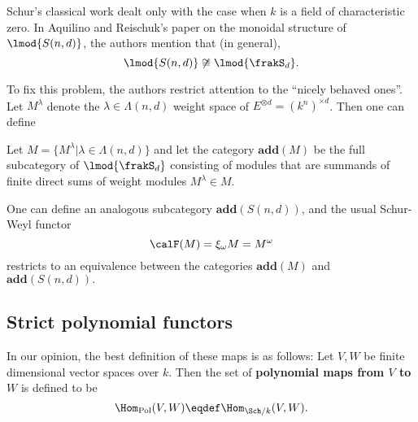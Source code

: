 \documentclass[12pt]{article}
\begin{document}
	Schur's classical work dealt only with the case when $k$ is a field of characteristic zero. In Aquilino and Reischuk's paper \cite{aquilino-reischuk} 
	on the monoidal structure of $\lmod{S(n,d)}$, the authors mention that (in general),
	\[\lmod{S(n,d)}\not\cong\lmod{\frakS_d}.\]

	To fix this problem, the authors restrict attention to the ``nicely behaved ones''. Let $M^\lambda$ denote 
	the $\lambda\in\Lambda(n,d)$ weight space of $E^{\otimes d}=(k^n)^{\times d}$. Then one can define 
	\begin{defn}
		Let $M=\{M^\lambda|\lambda\in\Lambda(n,d)\}$ and let the category $\mathbf{add}(M)$ be the full subcategory of $\lmod{\frakS_d}$ consisting 
		of modules that are summands of finite direct sums of weight modules $M^\lambda\in M$.
	\end{defn}
	One can define an analogous subcategory $\mathbf{add}(S(n,d))$, and the usual Schur-Weyl functor 
	\[\calF(M)=\xi_\omega M=M^\omega\]
	restricts to an equivalence between the categories $\mathbf{add}(M)$ and $\mathbf{add}(S(n,d)).$

	\subsection{Strict polynomial functors}
	\begin{rmk}
		In our opinion, the best definition of these maps is as follows:
		Let $V,W$ be finite dimensional vector spaces over $k$. Then the set of \textbf{polynomial maps from $V$ to $W$} is defined to be 
		\[\Hom_\text{Pol}(V,W)\eqdef \Hom_{\Sch/k}(V,W).\]
	\end{rmk}
	
\end{document}
